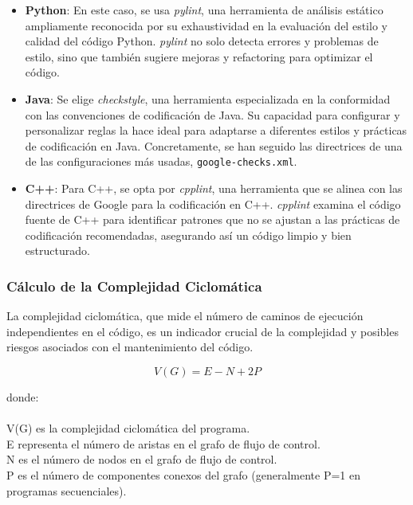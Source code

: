 \begin{itemize}
    \item \textbf{Python}: En este caso, se usa \textit{pylint}, una herramienta de análisis estático ampliamente reconocida por su exhaustividad en la evaluación del estilo y calidad del código Python. \textit{pylint} no solo detecta errores y problemas de estilo, sino que también sugiere mejoras y refactoring para optimizar el código.

    \item \textbf{Java}: Se elige \textit{checkstyle}, una herramienta especializada en la conformidad con las convenciones de codificación de Java. Su capacidad para configurar y personalizar reglas la hace ideal para adaptarse a diferentes estilos y prácticas de codificación en Java. Concretamente, se han seguido las directrices de una de las configuraciones más usadas, \texttt{google-checks.xml}.

    \item \textbf{C++}: Para C++, se opta por \textit{cpplint}, una herramienta que se alinea con las directrices de Google para la codificación en C++. \textit{cpplint} examina el código fuente de C++ para identificar patrones que no se ajustan a las prácticas de codificación recomendadas, asegurando así un código limpio y bien estructurado.
\end{itemize}

\subsubsection*{Cálculo de la Complejidad Ciclomática}

La complejidad ciclomática, que mide el número de caminos de ejecución independientes en el código, es un indicador crucial de la complejidad y posibles riesgos asociados con el mantenimiento del código.

\begin{equation}
    V(G) = E - N + 2P
\end{equation}

donde: \\ \\
    V(G) es la complejidad ciclomática del programa. \\
    E representa el número de aristas en el grafo de flujo de control. \\
    N es el número de nodos en el grafo de flujo de control.\\
    P es el número de componentes conexos del grafo (generalmente P=1 en programas secuenciales).\\

